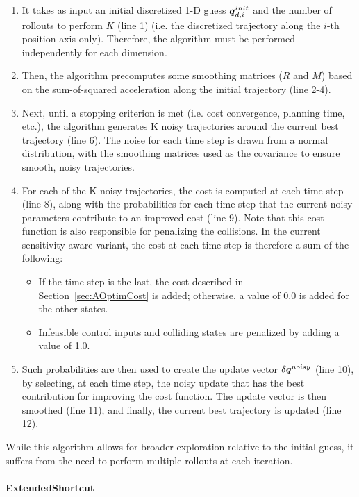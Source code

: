 \begin{enumerate}
    \item It takes as input an initial discretized 1-D guess $\boldsymbol{q}_{d,i}^{init}$ and the number of rollouts to perform $K$ (line 1) (i.e. the discretized trajectory along the $i$-th position axis only). 
    Therefore, the algorithm must be performed independently for each dimension. 
    \item Then, the algorithm precomputes some smoothing matrices ($R$ and $M$) based on the sum-of-squared acceleration along the initial trajectory (line 2-4).
    \item Next, until a stopping criterion is met (i.e. cost convergence, planning time, etc.), the algorithm generates K noisy trajectories around the current best trajectory (line 6).
    The noise for each time step is drawn from a normal distribution, with the smoothing matrices used as the covariance to ensure smooth, noisy trajectories.
    \item For each of the K noisy trajectories, the cost is computed at each time step (line 8), along with the probabilities for each time step that the current noisy parameters contribute to an improved cost (line 9).
    Note that this cost function is also responsible for penalizing the collisions.
    In the current sensitivity-aware variant, the cost at each time step is therefore a sum of the following:
    \begin{itemize}
        \item If the time step is the last, the cost described in Section~\ref{sec:AOptimCost} is added; otherwise, a value of 0.0 is added for the other states.
        \item Infeasible control inputs and colliding states are penalized by adding a value of 1.0.
    \end{itemize}
    \item Such probabilities are then used to create the update vector $\delta \boldsymbol{q}^{noisy}$ (line 10), by selecting, at each time step, the noisy update that has the best contribution for improving the cost function.
    The update vector is then smoothed (line 11), and finally, the current best trajectory is updated (line 12).
\end{enumerate}

While this algorithm allows for broader exploration relative to the initial guess, it suffers from the need to perform multiple rollouts at each iteration.

\paragraph{ExtendedShortcut}

